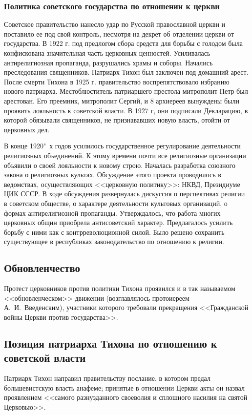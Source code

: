 \subsubsection{\textbf{Политика советского государства по отношении к церкви}}

Советское правительство нанесло удар по Русской православной церкви и поставило ее под свой контроль, несмотря на декрет об отделении церкви от государства. В 1922 г. под предлогом сбора средств для борьбы с голодом была конфискована значительная часть церковных ценностей. Усиливалась антирелигиозная пропаганда, разрушались храмы и соборы. Начались преследования священников. Патриарх Тихон был заключен под домашний арест. После смерти Тихона в 1925 г. правительство воспрепятствовало избранию нового патриарха. Местоблюститель патриаршего престола митрополит Петр был арестован. Его преемник, митрополит Сергий, и 8 архиереев вынуждены были проявить лояльность к советской власти. В 1927 г, они подписали Декларацию, в которой обязывали священников, не признававших новую власть, отойти от церковных дел.

В конце 1920"~х годов усилилось государственное регулирование деятельности религиозных объединений. К этому времени почти все религиозные организации объявили о своей лояльности к новому строю. Началась разработка союзного закона о религиозных культах. Обсуждение этого проекта проводилось в ведомствах, осуществляющих <<церковную политику>>: НКВД, Президиуме ЦИК СССР. В ходе обсуждения развернулась дискуссия о перспективах религии в советском обществе, о характере деятельности культовых организаций, о формах антирелигиозной пропаганды. Утверждалось, что работа многих церковных общин приобрела антисоветский характер. Предлагалось усилить борьбу с ними как с контрреволюционной силой. Было решено сохранить существующее в республиках законодательство по отношению к религии.

\subsection{Обновленчество}

Протест церковников против политики Тихона проявился и в так называемом <<обновленческом>> движении (возглавлялось протоиереем А.~И.~Введенским), участники которого требовали прекращения <<Гражданской войны Церкви против государства>>.

\subsection{Позиция патриарха Тихона по отношению к советской власти}

Патриарх Тихон направил правительству послание, в котором предал большевистскую власть анафеме; принятые в отношении Церкви акты он назвал проявлением <<самого разнузданного своеволия и сплошного насилия на святой Церковью>>. 
